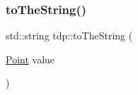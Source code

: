 \mbox{\label{namespacetdp_ade7149690123950b10455ece39159e94}} 
\subsubsection{\texorpdfstring{to\+The\+String()}{toTheString()}}
{\footnotesize\ttfamily std\+::string tdp\+::to\+The\+String (\begin{DoxyParamCaption}\item[{\mbox{\hyperlink{structtdp_1_1_point}{Point}}}]{value }\end{DoxyParamCaption})}

